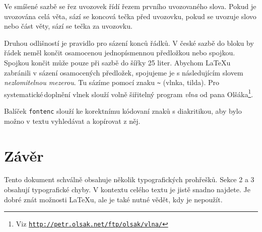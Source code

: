\documentclass[a4paper, 10pt, twocolumn]{article}
\begin{document}
Ve smíšené sazbě se řez uvozovek řídí řezem prvního uvozovaného slova.
Pokud je uvozována celá věta, sází se koncová tečka před uvozovku, pokud se uvozuje slovo nebo část věty, sází se tečka za uvozovku.

Druhou odlišností je pravidlo pro sázení konců řádků.
V české sazbě do bloku by řádek neměl končit osamocenou jednopísmennou předložkou nebo spojkou.
Spojkou  končit může pouze při sazbě do šířky 25 liter.
Abychom {\LaTeX}u zabránili v sázení osamocených předložek, spojujeme je s následujícím slovem {\it nezlomitelnou mezerou}.
Tu sázíme pomocí znaku \verb|~| (vlnka, tilda).
Pro systematické\,do\-plnění vlnek slouží volně šiřitelný program \emph{vlna} od pana 
Olšáka\footnote{Viz \href{http://petr.olsak.net/ftp/olsak/vlna/}{{\tt http://petr.olsak.net/ftp/olsak/vlna/}}}.

Balíček {\tt fontenc} slouží ke korektnímu kódovaní znaků s diakritikou, aby bylo možno v textu vyhledávat a kopí\-rovat z něj.

\section{Závěr}
Tento dokument schválně obsahuje několik typografických prohřešků.
Sekce 2 a 3 obsahují typografické chyby.
V kontextu celého textu je jistě snadno najdete.
Je dobré znát možnosti {\LaTeX}u, ale je také nutné vědět, kdy je nepoužít.
\end{document}
